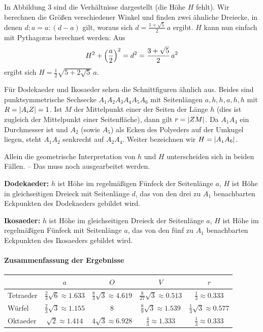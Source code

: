 \documentclass[11pt]{article}
\begin{document}
In Abbildung 3 sind die Verhältnisse dargestellt (die Höhe $H$ fehlt). Wir
berechnen die Größen verschiedener Winkel und finden zwei ähnliche Dreiecke,
in denen $d:a=a:(d-a)$ gilt, woraus sich $d=\frac{1+\sqrt{5}}{2}\,a$ ergibt.
$H$ kann nun einfach mit Pythagoras berechnet werden: Aus
\begin{gather*}
  H^2+\left(\frac{a}{2}\right)^2=d^2=\frac{3+\sqrt{5}}{2}\,a^2
\end{gather*}
ergibt sich $H=\frac12\sqrt{5+2\sqrt{5}}\,a$. 

Für Dodekaeder und Ikosaeder sehen die Schnittfiguren ähnlich aus.  Beides
sind punktsymmetrische Sechsecke $A_1A_2A_3A_4A_5A_6$ mit Seitenlängen
$a,h,h,a,h,h$ mit $R=\left\vert {\mathnormal{A_iZ}}\right\vert=1$. Ist $M$ der Mittelpunkt einer der
Seiten der Länge $h$ (dies ist zugleich der Mittelpunkt einer Seitenfläche),
dann gilt $r=\left\vert {\mathnormal{ZM}}\right\vert$.  Da $A_1A_4$ ein Durchmesser ist und $A_2$ (sowie
$A_5$) als Ecken des Polyeders auf der Umkugel liegen, steht $A_1A_2$
senkrecht auf $A_2A_4$.  Weiter bezeichnen wir $H=\left\vert {\mathnormal{A_1A_6}}\right\vert$.

Allein die geometrische Interpretation von $h$ und $H$ unterscheiden sich in
beiden Fällen. -- Das muss noch ausgearbeitet werden. 

\textbf{Dodekaeder:} $h$ ist Höhe im regelmäßigen Fünfeck der Seitenlänge
$a$, $H$ ist Höhe in gleichseitigen Dreieck mit Seitenlänge $d$, das von den
drei zu $A_1$ benachbarten Eckpunkten des Dodekaeders gebildet wird.

\textbf{Ikosaeder:} $h$ ist Höhe im gleichseitigen Dreieck der Seitenlänge
$a$, $H$ ist Höhe im regelmäßigen Fünfeck mit Seitenlänge $a$, das von den
fünf zu $A_1$ benachbarten Eckpunkten des Ikosaeders gebildet wird.



\paragraph{Zusammenfassung der Ergebnisse}
\begin{center}
  \begin{tabular}{|l|c|c|c|c|}\hline
    & $a$ & $O$ & $V$ & $r$ \\\hline
    Tetraeder & $\frac23\sqrt{6}\approx 1.633$ & $\frac83\sqrt{3} \approx
    4.619$ & $\frac{8}{27}\sqrt{3} \approx 0.513$ & $\frac13 \approx 0.333$\\ 
    Würfel & $\frac23\sqrt{3}\approx 1.155$ & $8$ & $\frac{8}{9}\sqrt{3}
    \approx 1.539$ & $\frac13\sqrt{3} \approx 0.577$ \\
    Oktaeder & $\sqrt{2}\approx 1.414$ & $4\sqrt{3}\approx 6.928$ &
    $\frac43 \approx 1.333$ & $\frac13 \approx 0.333$ \\\hline
  \end{tabular}
\end{center}
\end{document}
